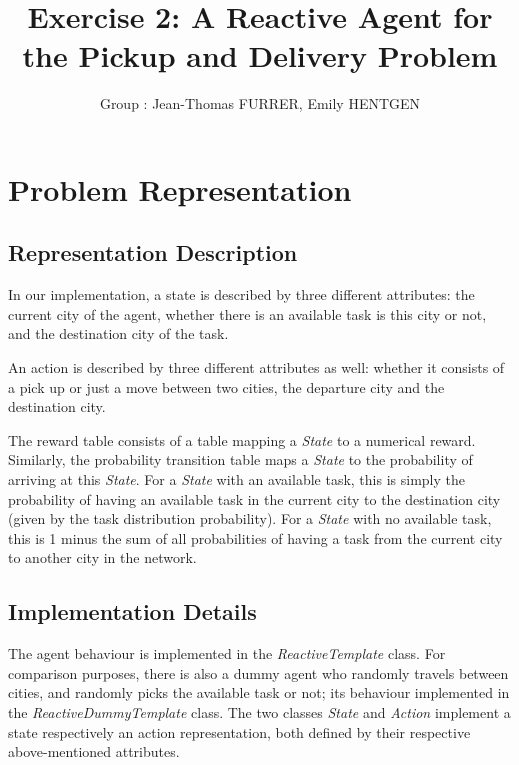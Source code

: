 \documentclass[11pt]{article}
\title{\bf Exercise 2: A Reactive Agent for the Pickup and Delivery Problem}
\author{Group \textnumero 23: Jean-Thomas FURRER, Emily HENTGEN}
\begin{document}
\maketitle

\section{Problem Representation}

\subsection{Representation Description}

In our implementation, a state is described by three different attributes:
the current city of the agent, whether there is an available task is this city or not, and the destination city of the task.

An action is described by three different attributes as well: whether it consists of a pick up or just a move between two cities, the departure city and the destination city.

The reward table consists of a table mapping a \textit{State} to a numerical reward. Similarly, the probability transition table maps a \textit{State} to the probability of arriving at this \textit{State}.
For a \textit{State} with an available task, this is simply the probability of having an available task in the current city to the destination city (given by the task distribution probability).
For a \textit{State} with no available task, this is 1 minus the sum of all probabilities of having a task from the current city to another city in the network.

\subsection{Implementation Details}

The agent behaviour is implemented in the \textit{ReactiveTemplate} class. For comparison purposes, there is also a dummy agent who randomly travels between cities, and randomly picks the available task or not; its behaviour implemented in the \textit{ReactiveDummyTemplate} class.
The two classes \textit{State} and \textit{Action} implement a state respectively an action representation, both defined by their respective above-mentioned attributes.
\end{document}
